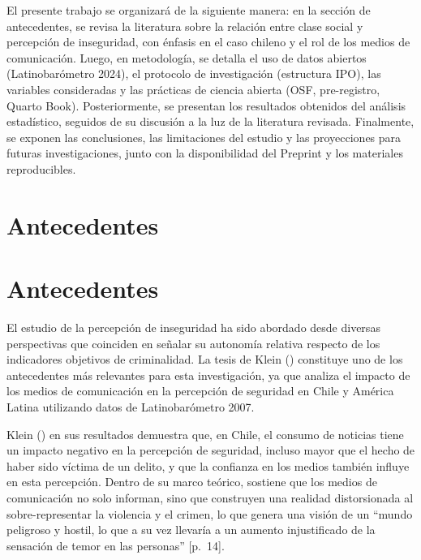 \documentclass[
  spanish,
  a4paper,
  oneside]{scrbook}
\begin{document}
El presente trabajo se organizará de la siguiente manera: en la sección
de antecedentes, se revisa la literatura sobre la relación entre clase
social y percepción de inseguridad, con énfasis en el caso chileno y el
rol de los medios de comunicación. Luego, en metodología, se detalla el
uso de datos abiertos (Latinobarómetro 2024), el protocolo de
investigación (estructura IPO), las variables consideradas y las
prácticas de ciencia abierta (OSF, pre-registro, Quarto Book).
Posteriormente, se presentan los resultados obtenidos del análisis
estadístico, seguidos de su discusión a la luz de la literatura
revisada. Finalmente, se exponen las conclusiones, las limitaciones del
estudio y las proyecciones para futuras investigaciones, junto con la
disponibilidad del Preprint y los materiales reproducibles.


\chapter{Antecedentes}\label{antecedentes}


\chapter{Antecedentes}\label{antecedentes-1}

El estudio de la percepción de inseguridad ha sido abordado desde
diversas perspectivas que coinciden en señalar su autonomía relativa
respecto de los indicadores objetivos de criminalidad. La tesis de Klein
() constituye uno de los
antecedentes más relevantes para esta investigación, ya que analiza el
impacto de los medios de comunicación en la percepción de seguridad en
Chile y América Latina utilizando datos de Latinobarómetro 2007.

Klein () en sus resultados
demuestra que, en Chile, el consumo de noticias tiene un impacto
negativo en la percepción de seguridad, incluso mayor que el hecho de
haber sido víctima de un delito, y que la confianza en los medios
también influye en esta percepción. Dentro de su marco teórico, sostiene
que los medios de comunicación no solo informan, sino que construyen una
realidad distorsionada al sobre-representar la violencia y el crimen, lo
que genera una visión de un ``mundo peligroso y hostil, lo que a su vez
llevaría a un aumento injustificado de la sensación de temor en las
personas'' {[}p.~14{]}.
\end{document}

